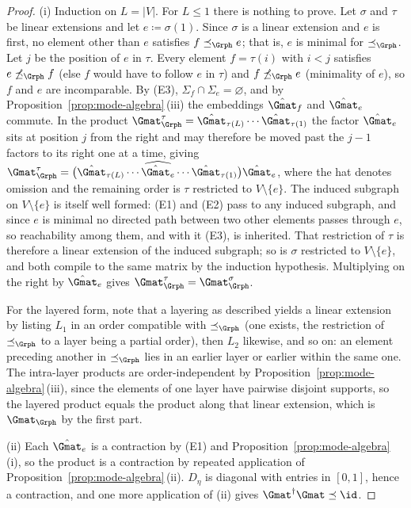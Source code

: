\begin{proof}
(i) Induction on $L=|V|$. For $L\le1$ there is nothing to prove. Let $\sigma$
and $\tau$ be linear extensions and let $e\coloneqq\sigma(1)$. Since $\sigma$
is a linear extension and $e$ is first, no element other than $e$ satisfies
$f\preceq_\Grph e$; that is, $e$ is minimal for $\preceq_\Grph$. Let $j$ be the
position of $e$ in $\tau$. Every element $f=\tau(i)$ with $i<j$ satisfies
$e\not\preceq_\Grph f$ (else $f$ would have to follow $e$ in $\tau$) and
$f\not\preceq_\Grph e$ (minimality of $e$), so $f$ and $e$ are incomparable.
By (E3), $\Sigma_f\cap\Sigma_e=\varnothing$, and by
Proposition~\ref{prop:mode-algebra}\,(iii) the embeddings $\hat\Gmat_f$ and
$\hat\Gmat_e$ commute. In the product
$\Gmat^{\tau}_{\Grph}=\hat\Gmat_{\tau(L)}\cdots\hat\Gmat_{\tau(1)}$ the factor
$\hat\Gmat_e$ sits at position $j$ from the right and may therefore be moved
past the $j-1$ factors to its right one at a time, giving
$\Gmat^{\tau}_{\Grph}=\big(\hat\Gmat_{\tau(L)}\cdots\widehat{\hat\Gmat_{e}}
\cdots\hat\Gmat_{\tau(1)}\big)\hat\Gmat_e$, where the hat denotes omission and
the remaining order is $\tau$ restricted to $V\setminus\{e\}$. The induced
subgraph on $V\setminus\{e\}$ is itself well formed: (E1) and (E2) pass to any
induced subgraph, and since $e$ is minimal no directed path between two other
elements passes through $e$, so reachability among them, and with it (E3), is
inherited. That restriction of $\tau$ is therefore a linear extension of the
induced subgraph; so is $\sigma$ restricted to $V\setminus\{e\}$, and both
compile to the same matrix by the induction hypothesis. Multiplying on the
right by $\hat\Gmat_e$ gives $\Gmat^\tau_\Grph=\Gmat^\sigma_\Grph$.

For the layered form, note that a layering as described yields a linear
extension by listing $L_1$ in an order compatible with $\preceq_\Grph$ (one
exists, the restriction of $\preceq_\Grph$ to a layer being a partial order),
then $L_2$ likewise, and so on: an element preceding another in
$\preceq_\Grph$ lies in an earlier layer or earlier within the same one. The
intra-layer products are order-independent by
Proposition~\ref{prop:mode-algebra}\,(iii), since the elements of one layer
have pairwise disjoint supports, so the layered product equals the product
along that linear extension, which is $\Gmat_\Grph$ by the first part.

(ii) Each $\hat\Gmat_e$ is a contraction by (E1) and
Proposition~\ref{prop:mode-algebra}\,(i), so the product is a contraction by
repeated application of Proposition~\ref{prop:mode-algebra}\,(ii). $D_\eta$ is
diagonal with entries in $[0,1]$, hence a contraction, and one more application
of (ii) gives $\Gmat^\dagger\Gmat\preceq\id$.


\end{proof}
